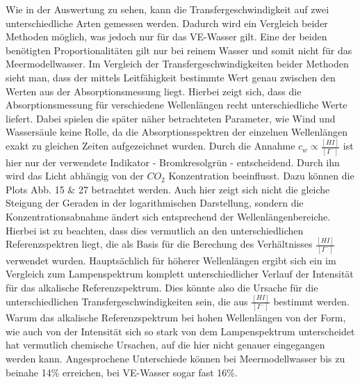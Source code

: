 \documentclass[12pt]{article}
\begin{document}
Wie in der Auswertung zu sehen, kann die Transfergeschwindigkeit auf zwei unterschiedliche Arten gemessen werden. Dadurch wird ein Vergleich beider Methoden möglich, was jedoch nur für das VE-Wasser gilt. Eine der beiden benötigten Proportionalitäten gilt nur bei reinem Wasser und somit nicht für das Meermodellwasser.
Im Vergleich der Transfergeschwindigkeiten beider Methoden sieht man, dass der mittels Leitfähigkeit bestimmte Wert genau zwischen den Werten aus der Absorptionsmessung liegt. Hierbei zeigt sich, dass die Absorptionsmessung für verschiedene Wellenlängen recht unterschiedliche Werte liefert. Dabei spielen die später näher betrachteten Parameter, wie Wind und Wassersäule keine Rolle, da die Absorptionsspektren der einzelnen Wellenlängen exakt zu gleichen Zeiten aufgezeichnet wurden.
Durch die Annahme $c_w \propto \frac{[HI]}{[I^-]}$ ist hier nur der verwendete Indikator - Bromkresolgrün - entscheidend. Durch ihn wird das Licht abhängig von der $CO_2$ Konzentration beeinflusst.  Dazu können die Plots Abb. 15 \& 27 betrachtet werden. Auch hier zeigt sich nicht die gleiche Steigung der Geraden in der logarithmischen Darstellung, sondern die Konzentrationsabnahme ändert sich entsprechend der Wellenlängenbereiche. Hierbei ist zu beachten, dass dies vermutlich an den unterschiedlichen Referenzspektren liegt, die als Basis für die Berechung des Verhältnisses $\frac{[HI]}{[I^-]}$ verwendet wurden. Hauptsächlich für höherer Wellenlängen ergibt sich ein im Vergleich zum Lampenspektrum komplett unterschiedlicher Verlauf der Intensität für das alkalische Referenzspektrum. Dies könnte also die Ursache für die unterschiedlichen Transfergeschwindigkeiten sein, die aus $\frac{[HI]}{[I^-]}$ bestimmt werden. Warum das alkalische Referenzspektrum bei hohen Wellenlängen von der Form, wie auch von der Intensität sich so stark von dem Lampenspektrum unterscheidet hat vermutlich chemische Ursachen, auf die hier nicht genauer eingegangen werden kann. Angesprochene Unterschiede können bei Meermodellwasser bis zu beinahe 14\% erreichen, bei VE-Wasser sogar fast 16\%.
\end{document}

